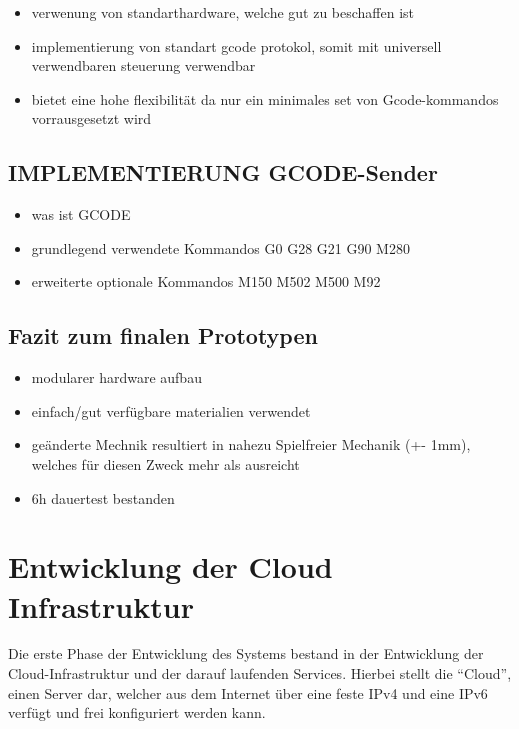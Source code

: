 \begin{itemize}
\tightlist
\item
  verwenung von standarthardware, welche gut zu beschaffen ist
\item
  implementierung von standart gcode protokol, somit mit universell
  verwendbaren steuerung verwendbar
\item
  bietet eine hohe flexibilität da nur ein minimales set von
  Gcode-kommandos vorrausgesetzt wird
\end{itemize}

\hypertarget{implementierung-gcode-sender}{%
\subsection{IMPLEMENTIERUNG
GCODE-Sender}\label{implementierung-gcode-sender}}

\begin{itemize}
\tightlist
\item
  was ist GCODE
\item
  grundlegend verwendete Kommandos G0 G28 G21 G90 M280
\item
  erweiterte optionale Kommandos M150 M502 M500 M92
\end{itemize}

\hypertarget{fazit-zum-finalen-prototypen}{%
\subsection{Fazit zum finalen
Prototypen}\label{fazit-zum-finalen-prototypen}}

\begin{itemize}
\tightlist
\item
  modularer hardware aufbau
\item
  einfach/gut verfügbare materialien verwendet
\item
  geänderte Mechnik resultiert in nahezu Spielfreier Mechanik (+- 1mm),
  welches für diesen Zweck mehr als ausreicht
\item
  6h dauertest bestanden
\end{itemize}

\hypertarget{entwicklung-der-cloud-infrastruktur}{%
\section{Entwicklung der Cloud
Infrastruktur}\label{entwicklung-der-cloud-infrastruktur}}

Die erste Phase der Entwicklung des Systems bestand in der Entwicklung
der Cloud-Infrastruktur und der darauf laufenden Services. Hierbei
stellt die ``Cloud'', einen Server dar, welcher aus dem Internet über
eine feste IPv4 und eine IPv6 verfügt und frei konfiguriert werden kann.

